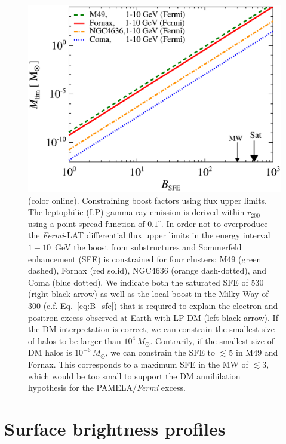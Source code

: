 \documentclass[10pt,aps,pra,reprint,amsmath,amsfonts,amssymb,showpacs,nofootinbib,floatfix]{revtex4-1}
\newcommand{\Fermi}{{\em Fermi}\xspace}
\newcommand{\msun}{M_\odot}
\newcommand{\degs}{^\circ}
\newcommand{\colo}{(color online). }
\newcommand{\rvir}{r_{200}}
\begin{document}
\begin{figure}%
 \includegraphics[width=0.99\columnwidth]{figures/LP.const.diff.v14.0.1deg.1.6T.SubMass.SF700.IR2.noMW.woGal.bw.eps}
 \caption{\colo Constraining boost factors using flux
   upper limits. The leptophilic (LP) gamma-ray emission is derived
   within $\rvir$ using a point spread function of $0.1\degs$. In order
   not to overproduce the \Fermi-LAT differential flux upper limits in
   the energy interval $1-10$~GeV the boost from substructures and
   Sommerfeld enhancement (SFE) is constrained for four clusters; M49
   (green dashed), Fornax (red solid), NGC4636 (orange dash-dotted),
   and Coma (blue dotted). We indicate both the saturated SFE of 530
   (right black arrow) as well as the local boost in the Milky Way of
   300 (c.f. Eq.~\ref{eq:B_sfe}) that is required to explain the
   electron and positron excess observed at Earth with LP DM (left
   black arrow). If the DM interpretation is correct, we can constrain
   the smallest size of halos to be larger than
   $10^4\,\msun$. Contrarily, if the smallest size of DM halos is
   $10^{-6}\,\msun$, we can constrain the SFE to $\lesssim 5$ in M49
   and Fornax. This corresponds to a maximum SFE in the MW of
   $\lesssim 3$, which would be too small to support the DM
   annihilation hypothesis for the PAMELA/\Fermi excess.}
 \label{fig:boost_const}
\end{figure}


\section{Surface brightness profiles}
\label{sect:spatial}
\end{document}
